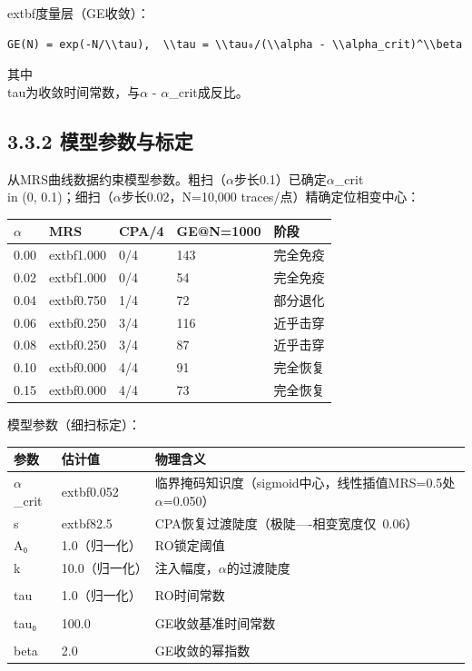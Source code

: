 \documentclass[journal]{IEEEtran}
\begin{document}
	extbf{度量层}（GE收敛）：
\begin{lstlisting}[breaklines=true]
GE(N) = exp(-N/\\tau),  \\tau = \\tau₀/(\\alpha - \\alpha_crit)^\\beta
\end{lstlisting}
其中\\tau为收敛时间常数，与$\alpha$ - $\alpha$\_crit成反比。

\subsection{3.3.2 模型参数与标定}

从MRS曲线数据约束模型参数。粗扫（$\alpha$步长0.1）已确定$\alpha$\_crit \\in (0, 0.1)；细扫（$\alpha$步长0.02，N=10,000 traces/点）精确定位相变中心：

\begin{table}[h]
\centering
\begin{tabular}{lllll}
\hline
\textbf{$\alpha$} & \textbf{MRS} & \textbf{CPA/4} & \textbf{GE@N=1000} & \textbf{阶段} \\
\hline
0.00 & 	extbf{1.000} & 0/4 & 143 & 完全免疫 \\
0.02 & 	extbf{1.000} & 0/4 & 54 & 完全免疫 \\
0.04 & 	extbf{0.750} & 1/4 & 72 & 部分退化 \\
0.06 & 	extbf{0.250} & 3/4 & 116 & 近乎击穿 \\
0.08 & 	extbf{0.250} & 3/4 & 87 & 近乎击穿 \\
0.10 & 	extbf{0.000} & 4/4 & 91 & 完全恢复 \\
0.15 & 	extbf{0.000} & 4/4 & 73 & 完全恢复 \\
\hline
\end{tabular}
\end{table}

模型参数（细扫标定）：

\begin{table}[h]
\centering
\begin{tabular}{lll}
\hline
\textbf{参数} & \textbf{估计值} & \textbf{物理含义} \\
\hline
$\alpha$\_crit & 	extbf{0.052} & 临界掩码知识度（sigmoid中心，线性插值MRS=0.5处$\alpha$=0.050） \\
s & 	extbf{82.5} & CPA恢复过渡陡度（极陡----相变宽度仅~0.06） \\
A₀ & 1.0（归一化） & RO锁定阈值 \\
k & 10.0（归一化） & 注入幅度，$\alpha$的过渡陡度 \\
\\tau & 1.0（归一化） & RO时间常数 \\
\\tau₀ & 100.0 & GE收敛基准时间常数 \\
\\beta & 2.0 & GE收敛的幂指数 \\
\hline
\end{tabular}
\end{table}
\end{document}
